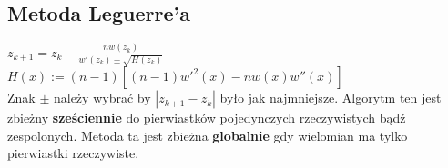 \documentclass{article}
\begin{document}
\begin{minipage}[t]{.33\textwidth}
\subsection*{Metoda Leguerre'a}
$z_{k+1} = z_k - \frac{nw(z_k)}{w'(z_k) \pm \sqrt{H(z_k)}}$
$H(x) := (n-1)[(n-1)w'^2(x) - nw(x)w''(x)]$\\
Znak $\pm$ należy wybrać by $|z_{k+1} - z_{k}|$ było jak najmniejsze. Algorytm ten jest zbieżny \textbf{sześciennie\;} do pierwiastków pojedynczych rzeczywistych bądź zespolonych. Metoda ta jest zbieżna \textbf{globalnie\;} gdy wielomian ma tylko pierwiastki rzeczywiste.

\end{minipage}
\end{document}
